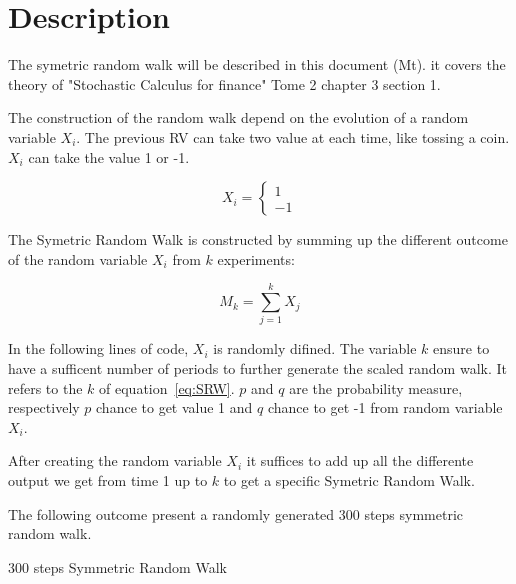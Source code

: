 \documentclass{article}\usepackage[]{graphicx}\usepackage[]{color}
\begin{document}

\section{Description}
The symetric random walk will be described in this document (Mt). it covers the theory of "Stochastic Calculus for finance" Tome 2 chapter 3 section 1.

The construction of the random walk depend on the evolution of a random variable $X_i$. The previous RV can take two value at each time, like tossing a coin. $X_i$ can take the value 1 or -1.

\begin{equation}
 \label{eq:Xi}
X_i = 
\left \{{
  \begin{array}{c} 1 \\ -1 \end{array}
  }\right .
\end{equation}
 
The Symetric Random Walk is constructed by summing up the different outcome of the random variable $X_i$ from $k$ experiments:

\begin{equation}
\label{eq:SRW}
M_k = 
\sum_{j=1}^k X_j
\end{equation}

In the following lines of code, $X_i$ is randomly difined. The variable $k$ ensure to have a sufficent number of periods to further generate the scaled random walk.
It refers to the $k$ of equation~\ref{eq:SRW}.
$p$ and $q$ are the probability measure, respectively $p$ chance to get value 1 and $q$ chance to get -1 from random variable $X_i$.





After creating the random variable $X_i$ it suffices to add up all the differente output we get from time 1 up to $k$ to get a specific Symetric Random Walk.

The following outcome present a randomly generated 300 steps symmetric random walk.

\begin{table}[h]

\caption{300 steps Symmetric Random Walk}
\end{table}
\end{document}
